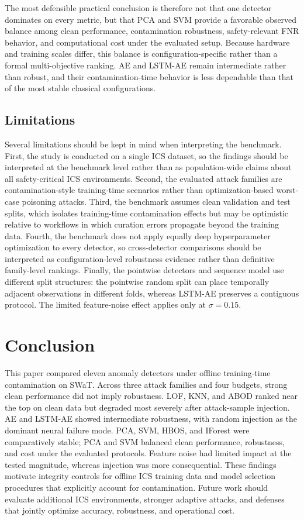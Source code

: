 \documentclass[10pt,conference]{IEEEtran}
\begin{document}
The most defensible practical conclusion is therefore not that one detector dominates on every metric, but that PCA and SVM provide a favorable observed balance among clean performance, contamination robustness, safety-relevant FNR behavior, and computational cost under the evaluated setup. Because hardware and training scales differ, this balance is configuration-specific rather than a formal multi-objective ranking. AE and LSTM-AE remain intermediate rather than robust, and their contamination-time behavior is less dependable than that of the most stable classical configurations.

\subsection{Limitations}

Several limitations should be kept in mind when interpreting the benchmark. First, the study is conducted on a single ICS dataset, so the findings should be interpreted at the benchmark level rather than as population-wide claims about all safety-critical ICS environments. Second, the evaluated attack families are contamination-style training-time scenarios rather than optimization-based worst-case poisoning attacks. Third, the benchmark assumes clean validation and test splits, which isolates training-time contamination effects but may be optimistic relative to workflows in which curation errors propagate beyond the training data. Fourth, the benchmark does not apply equally deep hyperparameter optimization to every detector, so cross-detector comparisons should be interpreted as configuration-level robustness evidence rather than definitive family-level rankings. Finally, the pointwise detectors and sequence model use different split structures: the pointwise random split can place temporally adjacent observations in different folds, whereas LSTM-AE preserves a contiguous protocol. The limited feature-noise effect applies only at $\sigma=0.15$.

\section{Conclusion}

This paper compared eleven anomaly detectors under offline training-time contamination on SWaT. Across three attack families and four budgets, strong clean performance did not imply robustness. LOF, KNN, and ABOD ranked near the top on clean data but degraded most severely after attack-sample injection. AE and LSTM-AE showed intermediate robustness, with random injection as the dominant neural failure mode. PCA, SVM, HBOS, and IForest were comparatively stable; PCA and SVM balanced clean performance, robustness, and cost under the evaluated protocols. Feature noise had limited impact at the tested magnitude, whereas injection was more consequential. These findings motivate integrity controls for offline ICS training data and model selection procedures that explicitly account for contamination. Future work should evaluate additional ICS environments, stronger adaptive attacks, and defenses that jointly optimize accuracy, robustness, and operational cost.


\balance


\end{document}
